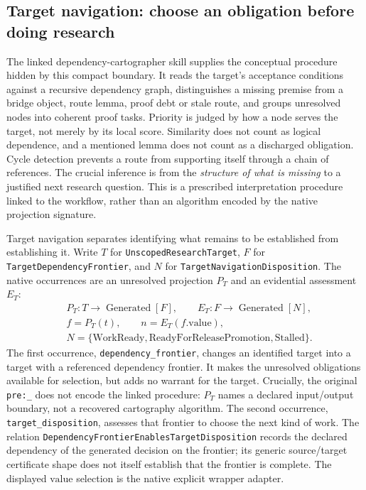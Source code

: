 %
%
%
\subsection{Target navigation: choose an obligation before doing research}
\label{app:granular-target-navigation-loop}
The linked dependency-cartographer skill supplies the conceptual procedure hidden
by this compact boundary. It reads the target's acceptance conditions against a
recursive dependency graph, distinguishes a missing premise from a bridge object,
route lemma, proof debt or stale route, and groups unresolved nodes into coherent
proof tasks. Priority is judged by how a node serves the target, not merely by
its local score. Similarity does not count as logical dependence, and a mentioned
lemma does not count as a discharged obligation. Cycle detection prevents a route
from supporting itself through a chain of references. The crucial inference is
from the \emph{structure of what is missing} to a justified next research question.
This is a prescribed interpretation procedure linked to the workflow, rather than
an algorithm encoded by the native projection signature.

Target navigation separates identifying what remains to be established from
establishing it. Write $T$ for \texttt{Unscoped\allowbreak Research\allowbreak Target}, $F$ for
\texttt{Target\allowbreak Dependency\allowbreak Frontier}, and $N$ for
\texttt{Target\allowbreak Navigation\allowbreak Disposition}. The native occurrences are an unresolved
projection $P_T$ and an evidential assessment $E_T$:
\[
\begin{aligned}
&P_T:T\to\operatorname{Generated}[F],\qquad
 E_T:F\to\operatorname{Generated}[N],\\
&f=P_T(t),\qquad n=E_T(f.\mathrm{value}),\\
&N=\{\mathrm{WorkReady},\mathrm{ReadyForReleasePromotion},\mathrm{Stalled}\}.
\end{aligned}
\]
The first occurrence, \texttt{dependency\_\allowbreak frontier}, changes an identified target
into a target with a referenced dependency frontier. It makes the unresolved
obligations available for selection, but adds no warrant for the target.
Crucially, the original \texttt{pre:\_\allowbreak } does not encode the linked procedure:
$P_T$ names a declared input/output boundary, not a recovered cartography
algorithm. The second occurrence, \texttt{target\_\allowbreak disposition}, assesses that
frontier to choose the next kind of work. The relation
\texttt{Dependency\allowbreak Frontier\allowbreak Enables\allowbreak Target\allowbreak Disposition} records the declared dependency
of the generated decision on the frontier; its generic source/target certificate
shape does not itself establish that the frontier is complete. The displayed
$\mathrm{value}$ selection is the native explicit wrapper adapter.

